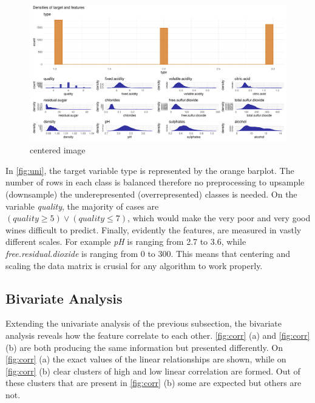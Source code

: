 \documentclass[11pt,twoside]{article}
\numberwithin{Theorem}{section}
\numberwithin{Definition}{section}
\numberwithin{Lemma}{section}
\numberwithin{Algorithm}{section}
\numberwithin{equation}{section}
\begin{document}
\vspace*{1em}
\begin{figure}[!h]
\centering
\includegraphics[width=\textwidth]{./output/1.h.univariate-analysis.pdf}
\caption{centered image}
\label{fig:uni}
\end{figure}
\vspace{2em}

In \autoref{fig:uni}, the target variable type is represented by the orange barplot. The number of rows in each class is balanced therefore no preprocessing to upsample (downsample) the underepresented (overrepresented) classes is needed. On the variable \textit{quality}, the majority of cases are \\
 $(quality\geq5) \lor (quality\leq7)$, which would make the very poor and very good wines difficult to predict. Finally, evidently the features, are measured in vastly different scales. For example \textit{pH} is ranging from 2.7 to 3.6, while \textit{free.residual.dioxide} is ranging from 0 to 300. This means that centering and scaling the data matrix is crusial for any algorithm to work properly.

\subsection{Bivariate Analysis}
\label{sec:bivariate}

Extending the univariate analysis of the previous subsection, the bivariate analysis reveals how the feature correlate to each other. \autoref{fig:corr} (a) and \autoref{fig:corr} (b) are both producing the same information but presented differently. On \autoref{fig:corr} (a) the exact values of the linear relationships are shown, while on \autoref{fig:corr} (b) clear clusters of high and low linear correlation are formed. Out of these clusters that are present in \autoref{fig:corr} (b) some are expected but others are not.
\end{document}
